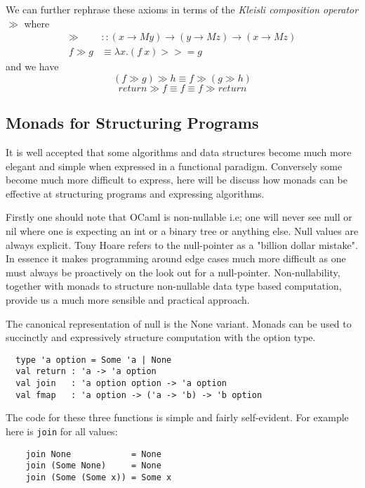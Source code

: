 We can further rephrase these axioms in terms
of the \textit{Kleisli composition operator} $\gg$ where
\begin{align}
    \gg &:: (x \rightarrow M y) \rightarrow (y \rightarrow M z) \rightarrow (x \rightarrow M z) \\
    f \gg g &\equiv \lambda x. (f\ x) >>= g
\end{align}
and we have
\begin{equation}
    (f \gg g) \gg h \equiv f \gg (g \gg h)
\end{equation}
\begin{equation}
    return \gg f \equiv f \equiv f \gg return
\end{equation}

\subsection{Monads for Structuring Programs}
It is well accepted that some algorithms and data structures become much more elegant
and simple when expressed in a functional paradigm\cite{okasaki2005alternatives}.
Conversely some become much more difficult to express,
here will be discuss how monads can be effective
at structuring programs and expressing algorithms.

Firstly one should note that OCaml is non-nullable i.e;
one will never see null or nil where one is expecting an
int or a binary tree or anything else.
Null values are always explicit.
Tony Hoare refers to the null-pointer as a
"billion dollar mistake"\cite{bdmistake}.
In essence it makes programming around edge
cases much more difficult as one must always
be proactively on the look out for a null-pointer.
Non-nullability, together with monads to structure
non-nullable data type based computation,
provide us a much more sensible and practical
approach.

The canonical representation of null is the None variant.
Monads can be used to succinctly and expressively structure computation with the option type.
\begin{verbatim}
  type 'a option = Some 'a | None
  val return : 'a -> 'a option
  val join   : 'a option option -> 'a option
  val fmap   : 'a option -> ('a -> 'b) -> 'b option
\end{verbatim}

The code for these three functions is simple and fairly self-evident.
For example here is \texttt{join} for all values:
\begin{verbatim}
    join None            = None
    join (Some None)     = None
    join (Some (Some x)) = Some x
\end{verbatim}

